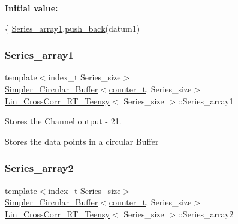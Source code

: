 {\bfseries Initial value\+:}
\begin{DoxyCode}
\{
    \hyperlink{classLin__CrossCorr__RT__Teensy_a13307ad04080703e9ef8c0cd9794a6b0}{Series\_array1}.\hyperlink{classSimpler__Circular__Buffer_af4bdd0a6d3fc7a8c06f62b0d996158f0}{push\_back}(datum1)
\end{DoxyCode}
\mbox{\label{classLin__CrossCorr__RT__Teensy_a13307ad04080703e9ef8c0cd9794a6b0}} 
\subsubsection{\texorpdfstring{Series\+\_\+array1}{Series\_array1}}
{\footnotesize\ttfamily template$<$index\+\_\+t Series\+\_\+size$>$ \\
\hyperlink{classSimpler__Circular__Buffer}{Simpler\+\_\+\+Circular\+\_\+\+Buffer}$<$\hyperlink{types_8hpp_a22f279793847eba127de149437848c48}{counter\+\_\+t}, Series\+\_\+size$>$ \hyperlink{classLin__CrossCorr__RT__Teensy}{Lin\+\_\+\+Cross\+Corr\+\_\+\+R\+T\+\_\+\+Teensy}$<$ Series\+\_\+size $>$\+::Series\+\_\+array1}



Stores the Channel output -\/ 21. 

Stores the data points in a circular Buffer \mbox{\label{classLin__CrossCorr__RT__Teensy_a509bcfdab5a3239a014f5805c388172a}} 
\subsubsection{\texorpdfstring{Series\+\_\+array2}{Series\_array2}}
{\footnotesize\ttfamily template$<$index\+\_\+t Series\+\_\+size$>$ \\
\hyperlink{classSimpler__Circular__Buffer}{Simpler\+\_\+\+Circular\+\_\+\+Buffer}$<$\hyperlink{types_8hpp_a22f279793847eba127de149437848c48}{counter\+\_\+t}, Series\+\_\+size$>$ \hyperlink{classLin__CrossCorr__RT__Teensy}{Lin\+\_\+\+Cross\+Corr\+\_\+\+R\+T\+\_\+\+Teensy}$<$ Series\+\_\+size $>$\+::Series\+\_\+array2}

